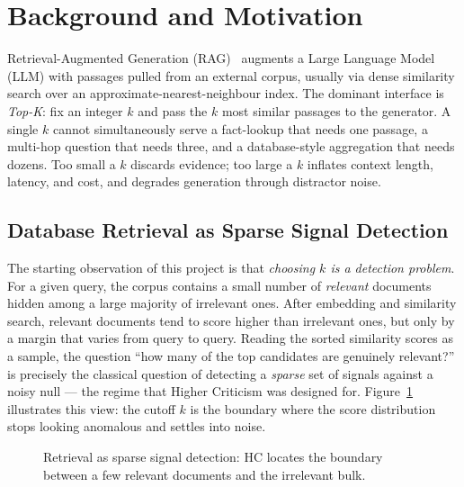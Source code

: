 \documentclass[letterpaper]{article}
\begin{document}
\section{Background and Motivation}

Retrieval-Augmented Generation (RAG)~\cite{lewis2020rag} augments a
Large Language Model (LLM) with passages pulled from an external
corpus, usually via dense similarity search over an
approximate-nearest-neighbour index. The dominant interface is
\emph{Top-K}: fix an integer $k$ and pass the $k$ most similar passages
to the generator. A single $k$ cannot simultaneously serve a
fact-lookup that needs one passage, a multi-hop question that needs
three, and a database-style aggregation that needs dozens. Too small a
$k$ discards evidence; too large a $k$ inflates context length,
latency, and cost, and degrades generation through distractor noise.

\subsection{Database Retrieval as Sparse Signal Detection}
The starting observation of this project is that \emph{choosing $k$ is
a detection problem}. For a given query, the corpus contains a small
number of \emph{relevant} documents hidden among a large majority of
irrelevant ones. After embedding and similarity search, relevant
documents tend to score higher than irrelevant ones, but only by a
margin that varies from query to query. Reading the sorted similarity
scores as a sample, the question ``how many of the top candidates are
genuinely relevant?'' is precisely the classical question of detecting
a \emph{sparse} set of signals against a noisy null --- the regime that
Higher Criticism was designed for. Figure~\ref{fig:sparse} illustrates
this view: the cutoff $k$ is the boundary where the score distribution
stops looking anomalous and settles into noise.

\begin{figure}[t]
\centering
{}
\caption{Retrieval as sparse signal detection: HC locates the boundary
between a few relevant documents and the irrelevant bulk.}
\label{fig:sparse}
\end{figure}
\end{document}
